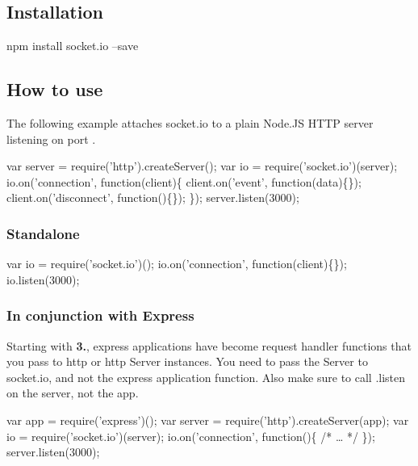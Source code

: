 \subsection*{Installation}


\begin{DoxyCode}
npm install socket.io --save
\end{DoxyCode}


\subsection*{How to use}

The following example attaches socket.\+io to a plain Node.\+JS H\+T\+TP server listening on port {}.


\begin{DoxyCode}
var server = require('http').createServer();
var io = require('socket.io')(server);
io.on('connection', function(client)\{
  client.on('event', function(data)\{\});
  client.on('disconnect', function()\{\});
\});
server.listen(3000);
\end{DoxyCode}


\subsubsection*{Standalone}


\begin{DoxyCode}
var io = require('socket.io')();
io.on('connection', function(client)\{\});
io.listen(3000);
\end{DoxyCode}


\subsubsection*{In conjunction with Express}

Starting with {\bfseries 3.}, express applications have become request handler functions that you pass to {\ttfamily http} or {\ttfamily http} {\ttfamily Server} instances. You need to pass the {\ttfamily Server} to {\ttfamily socket.\+io}, and not the express application function. Also make sure to call {\ttfamily .listen} on the {\ttfamily server}, not the {\ttfamily app}.


\begin{DoxyCode}
var app = require('express')();
var server = require('http').createServer(app);
var io = require('socket.io')(server);
io.on('connection', function()\{ /* … */ \});
server.listen(3000);
\end{DoxyCode}


